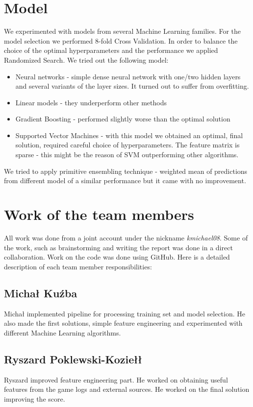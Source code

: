 \documentclass[a4paper]{article}
\begin{document}
\section{Model}
We experimented with models from several Machine Learning families.
For the model selection we performed 8-fold Cross Validation. 
In order to balance the choice of the optimal hyperparameters and the performance we applied Randomized Search.
We tried out the following model:
\begin{itemize}
\item Neural networks - simple dense neural network with one/two hidden layers and several variants of the layer sizes. It turned out to suffer from overfitting.
\item Linear models - they underperform other methods
\item Gradient Boosting - performed slightly worse than the optimal solution
\item Supported Vector Machines - with this model we obtained an optimal, final solution, required careful choice of hyperparameters.
The feature matrix is sparse - this might be the reason of SVM outperforming other algorithms.
\end{itemize}



We tried to apply primitive ensembling technique - weighted mean of predictions from different model of a similar performance but it came with no improvement.

\section{Work of the team members}
All work was done from a joint account under the nickname \emph{kmichael08}.
Some of the work, such as brainstorming and writing the report was done in a direct collaboration. 
Work on the code was done using GitHub.
Here is a detailed description of each team member responsibilities:

\subsection{Michał Kuźba}
Michał implemented pipeline for processing training set and model selection.
He also made the first solutions, simple feature engineering and experimented with different Machine Learning algorithms.

\subsection{Ryszard Poklewski-Koziełł}
Ryszard improved feature engineering part. He worked on obtaining useful features from the game logs and external sources. He worked on the final solution improving the score.
\end{document}
